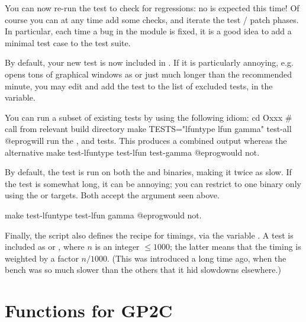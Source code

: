 {\item You can now re-run the test to check for regressions: no \kbd{[BUG]}
is expected this time! Of course you can at any time add some checks, and
iterate the test / patch phases. In particular, each time a bug in the
 module is fixed, it is a good idea to add a minimal test case to
the test suite.

\item By default, your new test is now included in . If
it is particularly annoying, e.g. opens tons of graphical windows as
 or just much longer than the recommended minute, you
may edit  and add the  test to the list of
excluded tests, in the  variable.

\item You can run a subset of existing tests by using the following idiom:
\bprog
  cd Oxxx     # call from relevant build directory
  make TESTS="lfuntype lfun gamma" test-all
@eprog\noindent will run the ,  and  tests.
This produces a combined output whereas the alternative
\bprog
  make test-lfuntype test-lfun test-gamma
@eprog\noindent would not.

\item By default, the test is run on both the  and 
binaries, making it twice as slow. If the test is somewhat long, it can
be annoying; you can restrict to one binary only using the 
or  targets. Both accept the  argument seen above.

\bprog
  make test-lfuntype test-lfun gamma
@eprog\noindent would not.

\item Finally, the  script also defines the recipe for
 timings, via the variable . A test is
included as  or , where $n$ is an integer $\leq 1000$;
the latter means that the timing is weighted by a factor $n/1000$. (This was
introduced a long time ago, when the  bench was so much slower
than the others that it hid slowdowns elsewhere.)

\section{Functions for GP2C}


}
